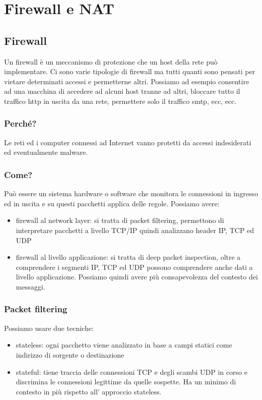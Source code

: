 \section{Firewall e NAT}
\subsection{Firewall}
Un firewall è un meccanismo di protezione che un host della rete può implementare.
Ci sono varie tipologie di firewall ma tutti quanti sono pensati per vietare determinati accessi e permetterne altri.
Possiamo ad esempio consentire ad una macchina di accedere ad alcuni host tranne ad altri, bloccare tutto il traffico http in uscita da una rete, permettere solo il traffico smtp, ecc, ecc.

\subsubsection{Perché?}
Le reti ed i computer connessi ad Internet vanno protetti da accessi indesiderati ed eventualmente malware.

\subsubsection{Come?}
Può essere un sistema hardware o software che monitora le connessioni in ingresso ed in uscita e su questi pacchetti applica delle regole.
Possiamo avere:
\begin{itemize}
    \item firewall al network layer: si tratta di packet filtering, permettono di interpretare pacchetti a livello TCP/IP quindi analizzano header IP, TCP ed UDP
    
    \item firewall al livello applicazione: si tratta di deep packet inspection, oltre a comprendere i segmenti IP, TCP ed UDP possono comprendere anche dati a livello applicazione.
    Possiamo quindi avere più consapevolezza del contesto dei messaggi.
\end{itemize}

\subsubsection{Packet filtering}
Possiamo usare due tecniche:
\begin{itemize}
    \item stateless: ogni pacchetto viene analizzato in base a campi statici come indirizzo di sorgente o destinazione
    
    \item stateful: tiene traccia delle connessioni TCP e degli scambi UDP in corso e discrimina le connessioni legittime da quelle sospette.
    Ha un minimo di contesto in più rispetto all' approccio stateless.
\end{itemize}

